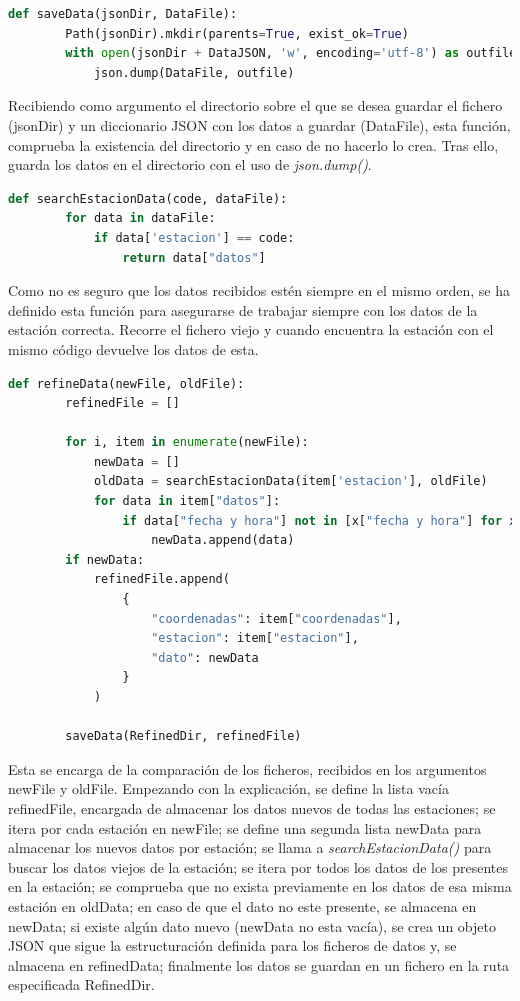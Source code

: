 \begin{lstlisting}[language=Python, caption={Declaración función saveFile()}]
	def saveData(jsonDir, DataFile):
		Path(jsonDir).mkdir(parents=True, exist_ok=True)
		with open(jsonDir + DataJSON, 'w', encoding='utf-8') as outfile:
			json.dump(DataFile, outfile)
\end{lstlisting}

Recibiendo como argumento el directorio sobre el que se desea guardar el fichero (jsonDir) y un diccionario JSON con los datos a guardar (DataFile), esta función, comprueba la existencia del directorio y en caso de no hacerlo lo crea. Tras ello, guarda los datos en el directorio con el uso de \textit{json.dump()}.

\begin{lstlisting}[language=Python, caption={Declaración función searchEstacionData()}]
	def searchEstacionData(code, dataFile):
		for data in dataFile:
			if data['estacion'] == code:
				return data["datos"]
\end{lstlisting}

Como no es seguro que los datos recibidos estén siempre en el mismo orden, se ha definido esta función para asegurarse de trabajar siempre con los datos de la estación correcta. Recorre el fichero viejo y cuando encuentra la estación con el mismo código devuelve los datos de esta.

\begin{lstlisting}[language=Python, caption={Declaración función refinedData()}]
	def refineData(newFile, oldFile):
		refinedFile = []
		
		for i, item in enumerate(newFile):
			newData = []
			oldData = searchEstacionData(item['estacion'], oldFile)
			for data in item["datos"]:
				if data["fecha y hora"] not in [x["fecha y hora"] for x in oldData]:
					newData.append(data)
		if newData:
			refinedFile.append(
				{
					"coordenadas": item["coordenadas"],
					"estacion": item["estacion"],
					"dato": newData
				}
			)
		
		saveData(RefinedDir, refinedFile)
\end{lstlisting}

Esta se encarga de la comparación de los ficheros, recibidos en los argumentos newFile y oldFile.\newline
\newline
Empezando con la explicación, se define la lista vacía refinedFile, encargada de almacenar los datos nuevos de todas las estaciones; se itera por cada estación en newFile; se define una segunda lista newData para almacenar los nuevos datos por estación; se llama a \textit{searchEstacionData()} para buscar los datos viejos de la estación; se itera por todos los datos de los presentes en la estación; se comprueba que no exista previamente en los datos de esa misma estación en oldData; en caso de que el dato no este presente, se almacena en newData; si existe algún dato nuevo (newData no esta vacía), se crea un objeto JSON que sigue la estructuración definida para los ficheros de datos y, se almacena en refinedData; finalmente los datos se guardan en un fichero en la ruta especificada RefinedDir.

